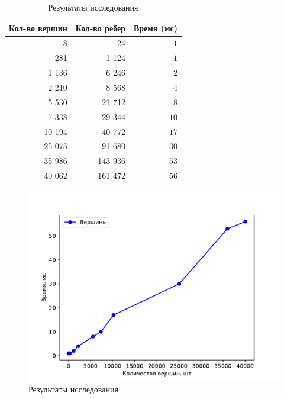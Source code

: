 \begin{table}[H]
	\begin{center}
		\begin{threeparttable}
			\captionsetup{justification=raggedright,singlelinecheck=off}
			\caption{Результаты исследования}
			\label{tbl:time_measurements}
			\begin{tabular}{|r|r|r|}
				\hline
				Кол-во вершин & Кол-во ребер & Время (мс) \\
				\hline
				8 & 24 &$ 1 $\\
				\hline
				281 & 1 124 &$ 1 $\\ 
				\hline
				1 136 & 6 246 &$ 2 $\\
				\hline
				2 210 & 8 568 &$ 4 $\\
				\hline
				5 530 & 21 712 &$ 8 $\\
				\hline
				7 338 & 29 344 &$ 10 $\\
				\hline
				10 194 & 40 772 &$ 17 $\\
				\hline
				25 075 & 91 680 &$ 30 $\\
				\hline
				35 986 & 143 936 &$ 53 $\\
				\hline
				40 062 & 161 472 &$ 56 $\\
				\hline
			\end{tabular}
		\end{threeparttable}
	\end{center}
\end{table}

\begin{figure}[h]
	\centering
	\includegraphics{images/tests_vertices.pdf}
	\caption{Результаты исследования}
	\label{fig:res_tests_vertices.pdf}
\end{figure}

